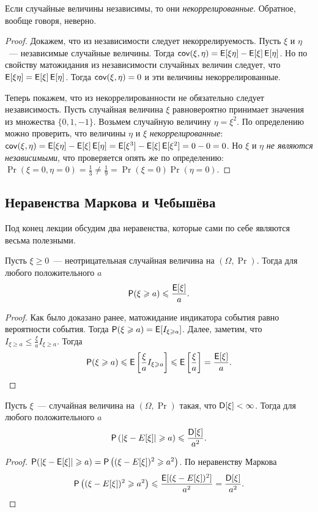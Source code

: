 \begin{theorem}
    Если случайные величины независимы, то они \emph{некоррелированные}. Обратное, вообще говоря, неверно.
\end{theorem}
\begin{proof}
    Докажем, что из независимости следует некоррелируемость. Пусть \(\xi\) и \(\eta\)~--- независимые случайные величины. Тогда \(\cov(\xi, \eta) = \E[\xi\eta] - \E[\xi]\E[\eta]\). Но по свойству матожидания из независимости случайных величин следует, что \(\E[\xi\eta] = \E[\xi]\E[\eta]\). Тогда \(\operatorname{\mathsf{cov}}(\xi, \eta) = 0\) и эти величины некоррелированные.
    
    Теперь покажем, что из некоррелированности не обязательно следует независимость. Пусть случайная величина \(\xi\) равновероятно принимает значения из множества \(\{0, 1, -1\}\). Возьмем случайную величину \(\eta = \xi^2\). По определению можно проверить, что величины \(\eta\) и \(\xi\) \emph{некоррелированные}: \(\cov(\xi, \eta) = \E[\xi\eta] - \E[\xi]\E[\eta] = \E[\xi^3] - \E[\xi]\E[\xi^2] = 0 - 0 = 0\). Но \(\xi\) и \(\eta\) \emph{не являются независимыми}, что проверяется опять же по определению: \(\Pr(\xi = 0, \eta = 0) = \frac{1}{3} \neq \frac{1}{9} = \Pr(\xi = 0)\Pr(\eta = 0)\).
\end{proof}

\subsection{Неравенства Маркова и Чебышёва}
Под конец лекции обсудим два неравенства, которые сами по себе являются весьма полезными.
\begin{theorem}
    Пусть \(\xi \geq 0\)~--- неотрицательная случайная величина на \((\Omega, \Pr)\). Тогда для любого положительного \(a\) \[\Pr(\xi \geq a) \leq \dfrac{\E[\xi]}{a}.\]
\end{theorem}
\begin{proof}
    Как было доказано ранее, матожидание индикатора события равно вероятности события. Тогда \(\Pr(\xi \geq a) = \E[I_{\xi \geq a}]\). Далее, заметим, что \(I_{\xi \geq a} \leq \frac{\xi}{a}I_{\xi \geq a}\). Тогда \[\Pr(\xi \geq a) \leq \E\left[\frac{\xi}{a}I_{\xi \geq a}\right] \leq \E\left[\frac{\xi}{a}\right] = \frac{\E[\xi]}{a}.\qedhere\]
\end{proof}
\begin{theorem}
    Пусть \(\xi\)~--- случайная величина на \((\Omega, \Pr)\) такая, что \(\D[\xi] < \infty\). Тогда для любого положительного \(a\) \[\Pr\left(|\xi - E[\xi]| \geq a\right) \leq \frac{\D[\xi]}{a^2}.\]
\end{theorem}
\begin{proof}
    \(\Pr(|\xi - \E[\xi]| \geq a) = \Pr\left((\xi - E[\xi])^2 \geq a^2\right)\). По неравенству Маркова
    \[\Pr\left((\xi - E[\xi])^2 \geq a^2\right) \leq \frac{\E[(\xi - E[\xi])^2]}{a^2} = \frac{\D[\xi]}{a^2}.\qedhere\]
\end{proof}